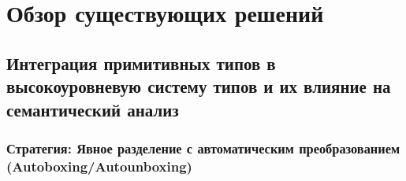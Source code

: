 \section{Обзор существующих решений}
\label{sec:Chapter2} 

\subsection{Интеграция примитивных типов в высокоуровневую систему типов и их влияние на семантический анализ}

\subsubsection{Стратегия: Явное разделение с автоматическим преобразованием (Autoboxing/Autounboxing)}

